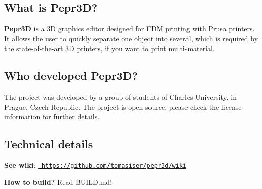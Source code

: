 \subsection*{What is Pepr3D?}

{\bfseries{Pepr3D}} is a 3D graphics editor designed for F\+DM printing with Prusa printers. It allows the user to quickly separate one object into several, which is required by the state-\/of-\/the-\/art 3D printers, if you want to print multi-\/material.

\subsection*{Who developed Pepr3D?}

The project was developed by a group of students of Charles University, in Prague, Czech Republic. The project is open source, please check the license information for further details.

\subsection*{Technical details}

{\bfseries{See wiki}}\+: \href{https://github.com/tomasiser/pepr3d/wiki}{\texttt{ https\+://github.\+com/tomasiser/pepr3d/wiki}}

{\bfseries{How to build?}} Read B\+U\+I\+LD.md! 